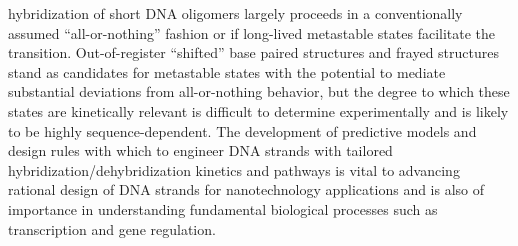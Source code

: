 \documentclass[journal=jpcbfk,manuscript=article]{achemso}
\begin{document}
hybridization of short DNA oligomers largely proceeds in a conventionally assumed ``all-or-nothing'' fashion or if long-lived metastable states facilitate the transition.\citep{Araque2016LatticeCooperativity, Sikora2013ModelingIntermediates, Wyer2014KineticsAT-tracts, Sanstead2016, Sanstead2018DirectDehybridization, Xiao2019} Out-of-register ``shifted'' base paired structures \citep{Hinckley2014Coarse-grainedEffects, Maciejczyk2014DNAModel, Araque2016LatticeCooperativity, Xiao2019, Romano2013DNADependence,Flamm2000RNAResolution} and frayed structures \citep{Zgarbova2014BaseRNA, Nonin1995TerminalFraying, Nikolova2012ProbingSimulations, Andreatta2006UltrafastHelix} stand as candidates for metastable states with the potential to mediate substantial deviations from all-or-nothing behavior, but the degree to which these states are kinetically relevant is difficult to determine experimentally and is likely to be highly sequence-dependent. The development of predictive models and design rules with which to engineer DNA strands with tailored hybridization/dehybridization kinetics and pathways is vital to advancing rational design of DNA strands for nanotechnology applications and is also of importance in understanding fundamental biological processes such as transcription and gene regulation.
\end{document}
